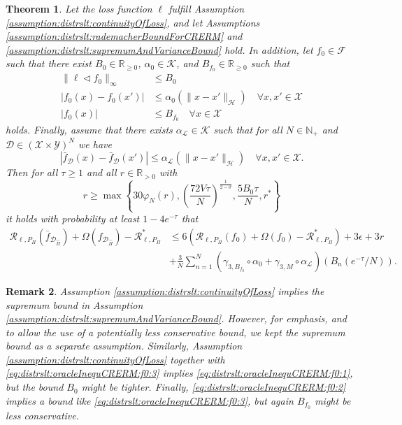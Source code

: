 \documentclass[letterpaper]{article} %
\newcommand{\R}{\mathbb{R}}
\newcommand{\Rnn}{\R_{\geq 0}}
\newcommand{\Rp}{\R_{> 0}}
\newcommand{\Np}{\mathbb{N}_+}
\newcommand{\hs}[1]{\mathcal{#1}} %
\newcommand{\cK}{\mathcal{K}} %
\newcommand{\inputSet}{\mathcal{X}} %
\newcommand{\outputSet}{\mathcal{Y}} %
\newcommand{\dataSet}{\mathcal{D}}
\newcommand{\risk}{\mathcal{R}} %
\newcommand{\Risk}[2]{\risk_{{#1},{#2}}} %
\newcommand{\RiskBayes}[2]{\risk_{{#1},{#2}}^\ast} %
\newcommand{\LearningAlg}[1]{\mathcal{L}_{#1}}
\newcommand{\hilbertianHS}{\hs{H}} %
\newcommand{\hilbertianEmbed}{\Pi} %
\newcommand{\pipe}{\lhd}
\newcommand{\regularizer}{\Omega}
\newcommand{\clipped}[1]{\bar{#1}}
\newtheorem{theorem}{Theorem}
\newtheorem{remark}[theorem]{Remark}
\begin{document}
\begin{theorem} \label{thm:distrslt:oracleInequCREM}
Let the loss function $\ell$ fulfill Assumption \ref{assumption:distrslt:continuityOfLoss},
and let Assumptions \ref{assumption:distrslt:rademacherBoundForCRERM} and \ref{assumption:distrslt:supremumAndVarianceBound} hold.
In addition, let $f_0 \in \mathcal{F}$ such that there exist $B_0\in\Rnn$, $\alpha_0\in\cK$, and $B_{f_0}\in\Rnn$ such that
\begin{align}
    \| \ell \pipe f_0 \|_\infty & \leq B_0 \label{eq:distrslt:oracleInequCRERM:f0:1} \\
    |f_0(x)-f_0(x')| & \leq \alpha_0(\|x-x'\|_\hilbertianHS) \quad \forall x,x'\in\inputSet  \label{eq:distrslt:oracleInequCRERM:f0:2} \\
    |f_0(x)| & \leq B_{f_0} \quad \forall x \in \inputSet  \label{eq:distrslt:oracleInequCRERM:f0:3}
\end{align}
holds.
Finally, assume that there exists $\alpha_{\LearningAlg{}}\in\cK$ such that for all $N\in\Np$ and $\dataSet\in (\inputSet\times\outputSet)^N$ we have
\begin{equation} \label{eq:distrslt:oracleInequCRERM:learnMethodContinuity}
    |\clipped{f}_\dataSet(x)-\clipped{f}_\dataSet(x')| \leq \alpha_{\LearningAlg{}}(\|x-x'\|_\hilbertianHS)
    \quad \forall x,x'\in\inputSet.
\end{equation}
Then for all $\tau\geq 1$ and all $r\in\Rp$ with
\begin{equation}
    r \geq \max\left\{
        30\varphi_N(r), 
        \left(\frac{72 V \tau}{N}\right)^{\frac{1}{2-\vartheta}}, 
        \frac{5 B_0\tau}{N}, 
        r^\ast 
    \right\}
\end{equation}
it holds with probability at least $1-4e^{-\tau}$ that
\begin{align} \label{eq:distrslt:oracleInequCRERM}
    \Risk{\ell}{P_\hilbertianEmbed}(\clipped{f}_{\dataSet_{\hat\hilbertianEmbed}}) 
        + \regularizer(f_{\dataSet_{\hat\hilbertianEmbed}}) - \RiskBayes{\ell}{P_\hilbertianEmbed}
    & \leq 6\left(\Risk{\ell}{P_\hilbertianEmbed}(f_0) + \regularizer(f_0) - \RiskBayes{\ell}{P_\hilbertianEmbed} \right)
        + 3\epsilon + 3r \nonumber \\
    & + \frac{3}{N} \sum_{n=1}^N (\gamma_{3,B_{f_0}} \circ \alpha_0 + \gamma_{3,M} \circ \alpha_{\LearningAlg{}})(B_n(e^{-\tau}/N)). 
\end{align}
\end{theorem}
\begin{remark}
Assumption \ref{assumption:distrslt:continuityOfLoss} implies the supremum bound in Assumption \ref{assumption:distrslt:supremumAndVarianceBound}.
However, for emphasis, and to allow the use of a potentially less conservative bound, we kept the supremum bound as a separate assumption.
Similarly, Assumption \ref{assumption:distrslt:continuityOfLoss} together with \eqref{eq:distrslt:oracleInequCRERM:f0:3} implies \eqref{eq:distrslt:oracleInequCRERM:f0:1}, but the bound $B_0$ might be tighter.
Finally, \eqref{eq:distrslt:oracleInequCRERM:f0:2} implies a bound like \eqref{eq:distrslt:oracleInequCRERM:f0:3}, but again $B_{f_0}$ might be less conservative.
\end{remark}
\end{document}
